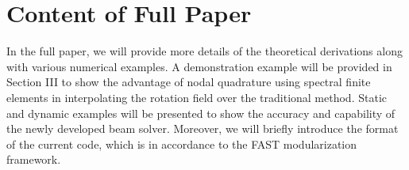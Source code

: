 \documentclass{aiaa-tc}
\begin{document}
 
 \section{Content of Full Paper} 

In the full paper, we will provide more details of the theoretical
derivations along with various numerical examples. A demonstration example
will be provided in Section III to show the advantage of nodal quadrature
using spectral finite elements in interpolating the rotation field over the
traditional method. Static and dynamic examples will be presented to show
the accuracy and capability of the newly developed beam solver. Moreover, we
will briefly introduce the format of the current code, which is in
accordance to the FAST modularization framework. 









\end{document}
